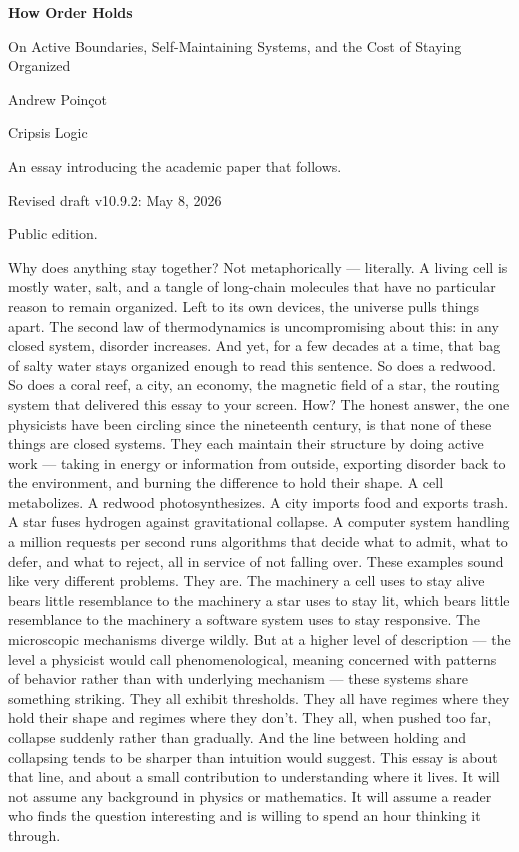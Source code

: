 \documentclass[12pt]{article}
\begin{document}
\begin{titlepage}
\centering
\vspace*{1.5in}
{\Huge\bfseries How Order Holds\par}
\vspace{0.4in}
{\Large On Active Boundaries, Self-Maintaining Systems, and the Cost of Staying Organized\par}
\vspace{0.8in}
{\large Andrew Poinçot\par}
{\large Cripsis Logic\par}
\vfill
{An essay introducing the academic paper that follows.\par}
{Revised draft v10.9.2: May 8, 2026 \par}
{Public edition.\par}

\end{titlepage}


Why does anything stay together? Not metaphorically --- literally. A living cell is mostly water, salt, and a tangle of long-chain molecules that have no particular reason to remain organized. Left to its own devices, the universe pulls things apart. The second law of thermodynamics is uncompromising about this: in any closed system, disorder increases. And yet, for a few decades at a time, that bag of salty water stays organized enough to read this sentence. So does a redwood. So does a coral reef, a city, an economy, the magnetic field of a star, the routing system that delivered this essay to your screen. How? The honest answer, the one physicists have been circling since the nineteenth century, is that none of these things are closed systems. They each maintain their structure by doing active work --- taking in energy or information from outside, exporting disorder back to the environment, and burning the difference to hold their shape. A cell metabolizes. A redwood photosynthesizes. A city imports food and exports trash. A star fuses hydrogen against gravitational collapse. A computer system handling a million requests per second runs algorithms that decide what to admit, what to defer, and what to reject, all in service of not falling over. These examples sound like very different problems. They are. The machinery a cell uses to stay alive bears little resemblance to the machinery a star uses to stay lit, which bears little resemblance to the machinery a software system uses to stay responsive. The microscopic mechanisms diverge wildly. But at a higher level of description --- the level a physicist would call phenomenological, meaning concerned with patterns of behavior rather than with underlying mechanism --- these systems share something striking. They all exhibit thresholds. They all have regimes where they hold their shape and regimes where they don't. They all, when pushed too far, collapse suddenly rather than gradually. And the line between holding and collapsing tends to be sharper than intuition would suggest. This essay is about that line, and about a small contribution to understanding where it lives. It will not assume any background in physics or mathematics. It will assume a reader who finds the question interesting and is willing to spend an hour thinking it through.
\end{document}
